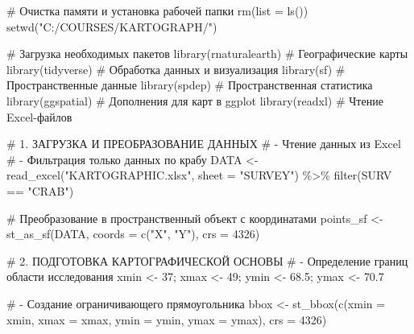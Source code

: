 \documentclass[
  letterpaper,
  DIV=11,
  numbers=noendperiod]{scrreprt}
\newenvironment{Shaded}{\begin{snugshade}}{\end{snugshade}}
\newcommand{\AttributeTok}[1]{\textcolor[rgb]{0.40,0.45,0.13}{#1}}
\newcommand{\CommentTok}[1]{\textcolor[rgb]{0.37,0.37,0.37}{#1}}
\newcommand{\DecValTok}[1]{\textcolor[rgb]{0.68,0.00,0.00}{#1}}
\newcommand{\FloatTok}[1]{\textcolor[rgb]{0.68,0.00,0.00}{#1}}
\newcommand{\FunctionTok}[1]{\textcolor[rgb]{0.28,0.35,0.67}{#1}}
\newcommand{\NormalTok}[1]{\textcolor[rgb]{0.00,0.23,0.31}{#1}}
\newcommand{\OtherTok}[1]{\textcolor[rgb]{0.00,0.23,0.31}{#1}}
\newcommand{\SpecialCharTok}[1]{\textcolor[rgb]{0.37,0.37,0.37}{#1}}
\newcommand{\StringTok}[1]{\textcolor[rgb]{0.13,0.47,0.30}{#1}}
\begin{document}
\begin{Shaded}
\begin{Highlighting}[]
\CommentTok{\# Очистка памяти и установка рабочей папки}
\FunctionTok{rm}\NormalTok{(}\AttributeTok{list =} \FunctionTok{ls}\NormalTok{())}
\FunctionTok{setwd}\NormalTok{(}\StringTok{"C:/COURSES/KARTOGRAPH/"}\NormalTok{)}

\CommentTok{\# Загрузка необходимых пакетов}
\FunctionTok{library}\NormalTok{(rnaturalearth)  }\CommentTok{\# Географические карты}
\FunctionTok{library}\NormalTok{(tidyverse)      }\CommentTok{\# Обработка данных и визуализация}
\FunctionTok{library}\NormalTok{(sf)             }\CommentTok{\# Пространственные данные}
\FunctionTok{library}\NormalTok{(spdep)          }\CommentTok{\# Пространственная статистика}
\FunctionTok{library}\NormalTok{(ggspatial)      }\CommentTok{\# Дополнения для карт в ggplot}
\FunctionTok{library}\NormalTok{(readxl)         }\CommentTok{\# Чтение Excel{-}файлов}

\CommentTok{\# 1. ЗАГРУЗКА И ПРЕОБРАЗОВАНИЕ ДАННЫХ}
\CommentTok{\# {-} Чтение данных из Excel}
\CommentTok{\# {-} Фильтрация только данных по крабу}
\NormalTok{DATA }\OtherTok{\textless{}{-}} \FunctionTok{read\_excel}\NormalTok{(}\StringTok{"KARTOGRAPHIC.xlsx"}\NormalTok{, }\AttributeTok{sheet =} \StringTok{"SURVEY"}\NormalTok{) }\SpecialCharTok{\%\textgreater{}\%} 
  \FunctionTok{filter}\NormalTok{(SURV }\SpecialCharTok{==} \StringTok{"CRAB"}\NormalTok{)}

\CommentTok{\# Преобразование в пространственный объект с координатами}
\NormalTok{points\_sf }\OtherTok{\textless{}{-}} \FunctionTok{st\_as\_sf}\NormalTok{(DATA, }\AttributeTok{coords =} \FunctionTok{c}\NormalTok{(}\StringTok{"X"}\NormalTok{, }\StringTok{"Y"}\NormalTok{), }\AttributeTok{crs =} \DecValTok{4326}\NormalTok{)}

\CommentTok{\# 2. ПОДГОТОВКА КАРТОГРАФИЧЕСКОЙ ОСНОВЫ}
\CommentTok{\# {-} Определение границ области исследования}
\NormalTok{xmin }\OtherTok{\textless{}{-}} \DecValTok{37}\NormalTok{; xmax }\OtherTok{\textless{}{-}} \DecValTok{49}\NormalTok{; ymin }\OtherTok{\textless{}{-}} \FloatTok{68.5}\NormalTok{; ymax }\OtherTok{\textless{}{-}} \FloatTok{70.7}

\CommentTok{\# {-} Создание ограничивающего прямоугольника}
\NormalTok{bbox }\OtherTok{\textless{}{-}} \FunctionTok{st\_bbox}\NormalTok{(}\FunctionTok{c}\NormalTok{(}\AttributeTok{xmin =}\NormalTok{ xmin, }\AttributeTok{xmax =}\NormalTok{ xmax, }\AttributeTok{ymin =}\NormalTok{ ymin, }\AttributeTok{ymax =}\NormalTok{ ymax), }\AttributeTok{crs =} \DecValTok{4326}\NormalTok{)}


\end{Highlighting}
\end{Shaded}
\end{document}
